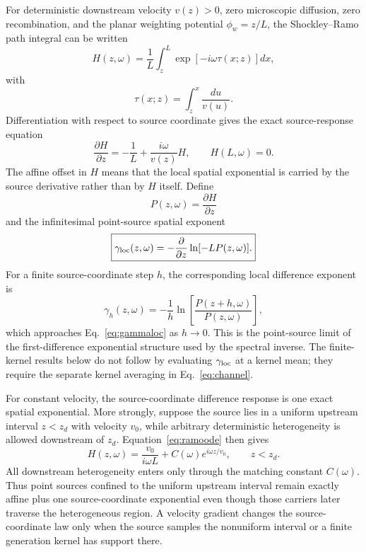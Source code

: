 \documentclass[aps,pra,twocolumn,superscriptaddress,nofootinbib]{revtex4-2}
\begin{document}
For deterministic downstream velocity $v(z)>0$, zero microscopic diffusion, zero recombination, and the planar weighting potential $\phi_w=z/L$, the Shockley--Ramo path integral \cite{shockley1938,ramo1939} can be written
\begin{equation}
H(z,\omega)
=\frac{1}{L}\int_z^L
\exp\left[-i\omega\tau(x;z)\right]dx,
\label{eq:Hpath}
\end{equation}
with
\begin{equation}
\tau(x;z)=\int_z^x\frac{du}{v(u)}.
\end{equation}
Differentiation with respect to source coordinate gives the exact source-response equation
\begin{equation}
\boxed{
\frac{\partial H}{\partial z}
=-\frac{1}{L}+\frac{i\omega}{v(z)}H,
\qquad H(L,\omega)=0.
}
\label{eq:ramoode}
\end{equation}
The affine offset in $H$ means that the local spatial exponential is carried by the source derivative rather than by $H$ itself. Define
\begin{equation}
P(z,\omega)=\frac{\partial H}{\partial z}
\end{equation}
and the infinitesimal point-source spatial exponent
\begin{equation}
\boxed{
\gamma_{\rm loc}(z,\omega)
=-\frac{\partial}{\partial z}
\ln[-L P(z,\omega)].
}
\label{eq:gammaloc}
\end{equation}
For a finite source-coordinate step $h$, the corresponding local difference exponent is
\begin{equation}
\gamma_h(z,\omega)
=-\frac{1}{h}
\ln\!\left[\frac{P(z+h,\omega)}{P(z,\omega)}\right],
\end{equation}
which approaches Eq.~\eqref{eq:gammaloc} as $h\rightarrow0$.  This is the point-source limit of the first-difference exponential structure used by the spectral inverse.  The finite-kernel results below do not follow by evaluating $\gamma_{\rm loc}$ at a kernel mean; they require the separate kernel averaging in Eq.~\eqref{eq:channel}.

For constant velocity, the source-coordinate difference response is one exact spatial exponential. More strongly, suppose the source lies in a uniform upstream interval $z<z_d$ with velocity $v_0$, while arbitrary deterministic heterogeneity is allowed downstream of $z_d$. Equation~\eqref{eq:ramoode} then gives
\begin{equation}
\boxed{H(z,\omega)=\frac{v_0}{i\omega L}+C(\omega)e^{i\omega z/v_0},\qquad z<z_d.}
\label{eq:upstreambridge}
\end{equation}
All downstream heterogeneity enters only through the matching constant $C(\omega)$. Thus point sources confined to the uniform upstream interval remain exactly affine plus one source-coordinate exponential even though those carriers later traverse the heterogeneous region. A velocity gradient changes the source-coordinate law only when the source samples the nonuniform interval or a finite generation kernel has support there.
\end{document}
